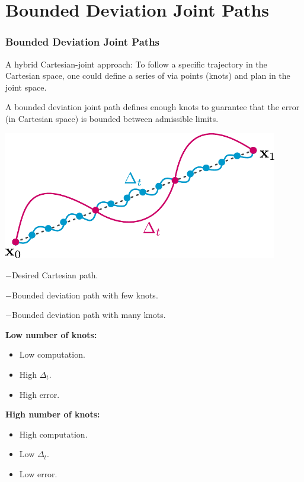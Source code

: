 \documentclass[10pt, aspectratio=169]{beamer}
\theoremstyle{remark}
\theoremstyle{definition}
\begin{document}
\section{Bounded Deviation Joint Paths}
\begin{frame}[allowframebreaks]
\frametitle{Bounded Deviation Joint Paths}

A hybrid Cartesian-joint approach: To follow a specific trajectory in the Cartesian space, one could define a series of via points (knots) and plan in the joint space.

A bounded deviation joint path defines enough knots to guarantee that the error (in Cartesian space) is bounded between admissible limits.

 \begin{center}
    \begin{minipage}{.5\linewidth}
    \includegraphics[width = 0.9\textwidth]{images/bounded_joint_path.pdf}
    
    $-$Desired Cartesian path.
    
    \textcolor{uma_pink}{$-$Bounded deviation path with few knots.}
    
    \textcolor{uma_blue_light}{$-$Bounded deviation path with many knots.}
    \end{minipage}%
    \hspace{0.5cm}
    \begin{minipage}{.45\linewidth}
    \textcolor{uma_pink}{\textbf{Low number of knots:}}
        \begin{itemize}
            \item Low computation.
            \item High $\Delta_t$.
            \item High error.
        \end{itemize}
    \textcolor{uma_blue_light}{\textbf{High number of knots:}}
    \begin{itemize}
        \item High computation.
        \item Low $\Delta_t$.
        \item Low error.
    \end{itemize}
    \end{minipage}
    \end{center}


\end{frame}
\end{document}
